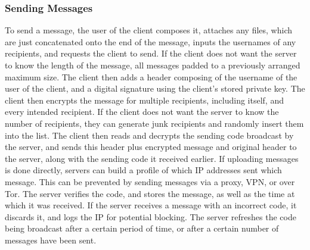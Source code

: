\documentclass{article}
\begin{document}
\subsubsection{Sending Messages}
To send a message, the user of the client composes it, attaches any files, which are just concatenated onto the end of the message, inputs the usernames of any recipients, and requests the client to send. If the client does not want the server to know the length of the message, all messages padded to a previously arranged maximum size. The client then adds a header composing of the username of the user of the client, and a digital signature using the client's stored private key. The client then encrypts the message for multiple recipients, including itself, and every intended recipient. If the client does not want the server to know the number of recipients, they can generate junk recipients and randomly insert them into the list. The client then reads and decrypts the sending code broadcast by the server, and sends this header plus encrypted message and original header to the server, along with the sending code it received earlier. If uploading messages is done directly, servers can build a profile of which IP addresses sent which message. This can be prevented by sending messages via a proxy, VPN, or over Tor. The server verifies the code, and stores the message, as well as the time at which it was received. If the server receives a message with an incorrect code, it discards it, and logs the IP for potential blocking. The server refreshes the code being broadcast after a certain period of time, or after a certain number of messages have been sent.
\end{document}
